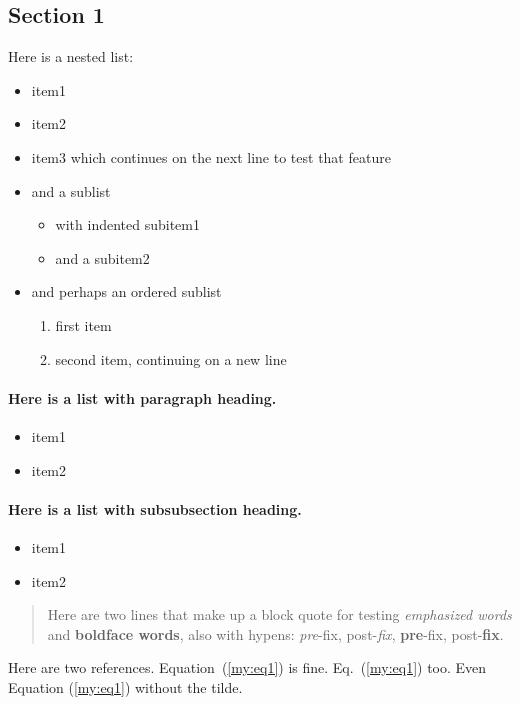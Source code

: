 \documentclass[%
oneside,                 %
final,                   %
10pt]{article}
\theoremstyle{definition}
\begin{document}
\subsection{Section 1}
\label{sec1}
Here is a nested list:
\begin{itemize}
  \item item1
  \item item2
  \item item3 which continues
    on the next line to test that feature
  \item and a sublist
\begin{itemize}
    \item with indented subitem1
    \item and a subitem2
\end{itemize}
\noindent
  \item and perhaps an ordered sublist
\begin{enumerate}
   \item first item
   \item second item,
      continuing on a new line
\end{enumerate}
\noindent
\end{itemize}
\noindent
\paragraph{Here is a list with paragraph heading.}
\begin{itemize}
  \item item1
  \item item2
\end{itemize}
\noindent
\paragraph{Here is a list with subsubsection heading.}
\begin{itemize}
  \item item1
  \item item2
\end{itemize}
\noindent

\begin{quote}
Here are two lines that make up
a block quote for testing \emph{emphasized words} and \textbf{boldface words},
also with hypens:
\emph{pre}-fix, post-\emph{fix}, \textbf{pre}-fix, post-\textbf{fix}.
\end{quote}

Here are two references. Equation~(\ref{my:eq1}) is fine. Eq.~(\ref{my:eq1}) too.
Even Equation (\ref{my:eq1}) without the tilde.
\end{document}

